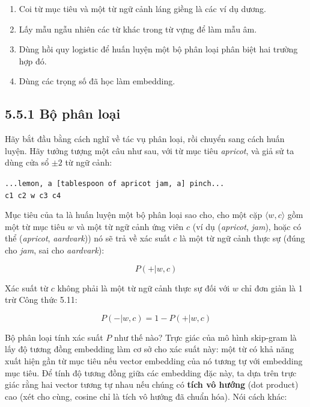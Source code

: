 \begin{enumerate}
  \item Coi từ mục tiêu và một từ ngữ cảnh láng giềng là các ví dụ dương.
  \item Lấy mẫu ngẫu nhiên các từ khác trong từ vựng để làm mẫu âm.
  \item Dùng hồi quy logistic để huấn luyện một bộ phân loại phân biệt hai trường hợp đó.
  \item Dùng các trọng số đã học làm embedding.
\end{enumerate}

\subsection*{5.5.1 Bộ phân loại}

Hãy bắt đầu bằng cách nghĩ về tác vụ phân loại, rồi chuyển sang cách huấn luyện. Hãy tưởng tượng một câu như sau, với từ mục tiêu \emph{apricot}, và giả sử ta dùng cửa sổ $\pm 2$ từ ngữ cảnh:

\begin{center}
\texttt{...lemon, a [tablespoon of apricot jam, a] pinch...}\\
\texttt{\hspace{2.3cm}c1 \hspace{0.6cm} c2 \hspace{0.3cm} w \hspace{0.5cm} c3 \hspace{0.7cm} c4}
\end{center}

Mục tiêu của ta là huấn luyện một bộ phân loại sao cho, cho một cặp $\langle w,c \rangle$ gồm một từ mục tiêu $w$ và một từ ngữ cảnh ứng viên $c$ (ví dụ (\emph{apricot}, \emph{jam}), hoặc có thể (\emph{apricot}, \emph{aardvark})) nó sẽ trả về xác suất $c$ là một từ ngữ cảnh thực sự (đúng cho \emph{jam}, sai cho \emph{aardvark}):

\begin{equation}
P(+|w,c) \tag{5.11}
\end{equation}

Xác suất từ $c$ không phải là một từ ngữ cảnh thực sự đối với $w$ chỉ đơn giản là 1 trừ Công thức 5.11:

\begin{equation}
P(-|w,c) = 1 - P(+|w,c) \tag{5.12}
\end{equation}

Bộ phân loại tính xác suất $P$ như thế nào? Trực giác của mô hình skip-gram là lấy độ tương đồng embedding làm cơ sở cho xác suất này: một từ có khả năng xuất hiện gần từ mục tiêu nếu vector embedding của nó tương tự với embedding mục tiêu. Để tính độ tương đồng giữa các embedding đặc này, ta dựa trên trực giác rằng hai vector tương tự nhau nếu chúng có \textbf{tích vô hướng} (dot product) cao (xét cho cùng, cosine chỉ là tích vô hướng đã chuẩn hóa). Nói cách khác:

